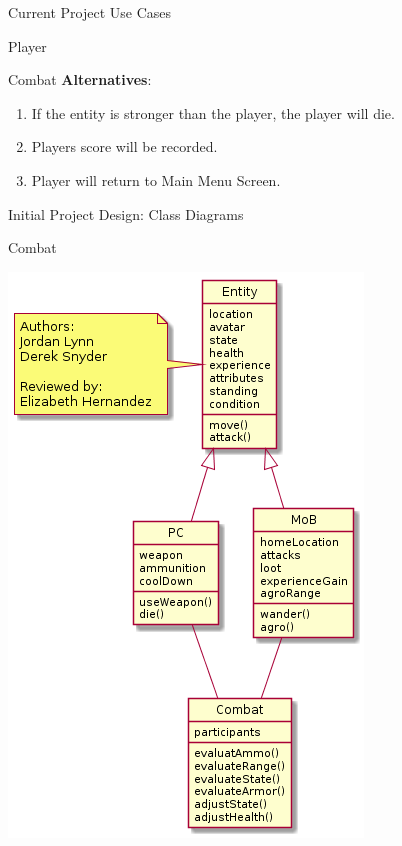 \documentclass[12pt]{report}
\begin{document}
\begin{chapter}{Current Project Use Cases}
\begin{section}{Player}
\begin{subsection}{Combat}
      \textbf{Alternatives}:
      \begin{enumerate}
        \item If the entity is stronger than the player, the player will die.
        \item Players score will be recorded.
        \item Player will return to Main Menu Screen.
      \end{enumerate}
     \end{subsection}
    \end{section}
  \end{chapter}
  
  
  \begin{chapter}{Initial Project Design: Class Diagrams}
   \begin{section}{Combat}
    \centerline{\includegraphics[width=\textwidth,height=\textheight,keepaspectratio]{./images/combat.png}}
	

\end{section}
\end{chapter}
\end{document}
